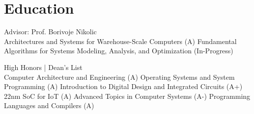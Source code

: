 \documentclass[]{deedy-resume-openfont}
\begin{document}
%
%

%
%



\section{Education}


Advisor: Prof. Borivoje Nikolic
\vspace*{3pt}
\\
 Architectures and Systems for Warehouse-Scale Computers (A)
\textbullet{}
Fundamental Algorithms for Systems Modeling, Analysis, and Optimization (In-Progress)

\vspace{6pt}

High Honors | Dean's List
\vspace*{3pt}
\\
 Computer Architecture and Engineering (A)
\textbullet{}
Operating Systems and System Programming (A)
\textbullet{}
Introduction to Digital Design and Integrated Circuits (A+)
\textbullet{}
22nm SoC for IoT (A)
\textbullet{}
Advanced Topics in Computer Systems (A-)
\textbullet{}
Programming Languages and Compilers (A)

\sectionsep
\end{document}
